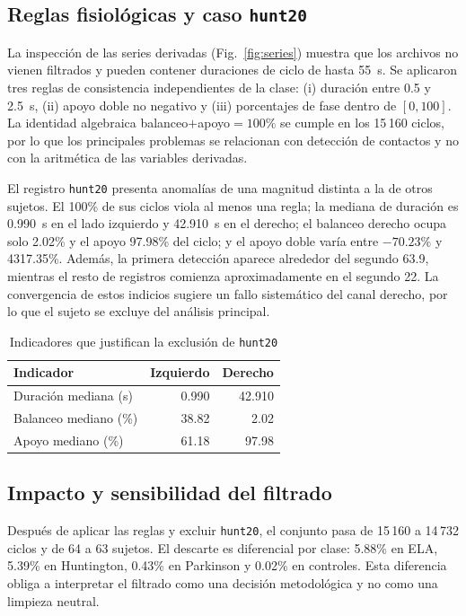 \documentclass[conference]{IEEEtran}
\begin{document}
\subsection{Reglas fisiológicas y caso \texttt{hunt20}}
La inspección de las series derivadas (Fig.~\ref{fig:series}) muestra que los archivos no vienen filtrados y pueden contener duraciones de ciclo de hasta 55~s. Se aplicaron tres reglas de consistencia independientes de la clase: (i) duración entre 0.5 y 2.5~s, (ii) apoyo doble no negativo y (iii) porcentajes de fase dentro de $[0,100]$. La identidad algebraica balanceo$+$apoyo$=100\%$ se cumple en los 15\,160 ciclos, por lo que los principales problemas se relacionan con detección de contactos y no con la aritmética de las variables derivadas.

El registro \texttt{hunt20} presenta anomalías de una magnitud distinta a la de otros sujetos. El 100\% de sus ciclos viola al menos una regla; la mediana de duración es 0.990~s en el lado izquierdo y 42.910~s en el derecho; el balanceo derecho ocupa solo 2.02\% y el apoyo 97.98\% del ciclo; y el apoyo doble varía entre $-70.23\%$ y 4317.35\%. Además, la primera detección aparece alrededor del segundo 63.9, mientras el resto de registros comienza aproximadamente en el segundo 22. La convergencia de estos indicios sugiere un fallo sistemático del canal derecho, por lo que el sujeto se excluye del análisis principal.

\begin{table}[t]
\caption{Indicadores que justifican la exclusión de \texttt{hunt20}}
\label{tab:hunt20}
\centering
\small
\begin{tabular}{lrr}
\toprule
Indicador & Izquierdo & Derecho \\
\midrule
Duración mediana (s) & 0.990 & 42.910 \\
Balanceo mediano (\%) & 38.82 & 2.02 \\
Apoyo mediano (\%) & 61.18 & 97.98 \\
\bottomrule
\end{tabular}
\end{table}

\subsection{Impacto y sensibilidad del filtrado}
Después de aplicar las reglas y excluir \texttt{hunt20}, el conjunto pasa de 15\,160 a 14\,732 ciclos y de 64 a 63 sujetos. El descarte es diferencial por clase: 5.88\% en ELA, 5.39\% en Huntington, 0.43\% en Parkinson y 0.02\% en controles. Esta diferencia obliga a interpretar el filtrado como una decisión metodológica y no como una limpieza neutral.
\end{document}
